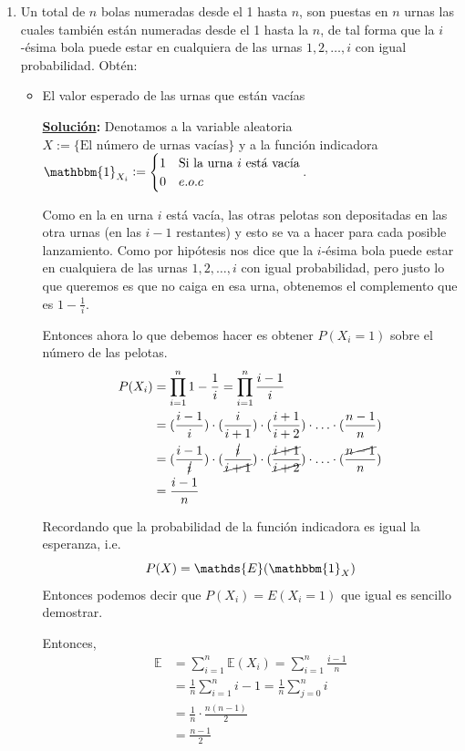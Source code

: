 \documentclass[11pt,letterpaper]{report}
\newcommand{\sol}{\textbf{\underline{Solución}: }} %
\begin{document}
\begin{enumerate}
\item Un total de $n$ bolas numeradas desde el 1 hasta $n$, son puestas en $n$ urnas las cuales
también están numeradas desde el 1 hasta la $n$, de tal forma que la $i$-ésima bola puede estar en
cualquiera de las urnas $1,2,\ldots,i$ con igual probabilidad. Obtén:
\begin{itemize}
    \item El valor esperado de las urnas que están vacías
    
    \sol Denotamos a la variable aleatoria $X := \{\text{El número de urnas vacías}\}$ y a la
    función indicadora
    $\mathbbm{1}_{X_i} := \begin{cases}
        1 & \text{Si la urna $i$ está vacía}\\
        0 & e.o.c
    \end{cases}$.

    Como en la en urna $i$ está vacía, las otras pelotas son depositadas en las otra urnas (en las
    $i-1$ restantes) y esto se va a hacer para cada posible lanzamiento. Como por hipótesis nos
    dice que la $i$-ésima bola puede estar en cualquiera de las urnas $1,2,\ldots,i$ con igual
    probabilidad, pero justo lo que queremos es que no caiga en esa urna, obtenemos el complemento
    que es $1 - \frac{1}{i}$.

    Entonces ahora lo que debemos hacer es obtener $P(X_i = 1)$ sobre el número de las pelotas.
    \begin{align*}
        P(X_i)
            &= \prod_{i=1}^{n} 1 - \frac{1}{i} = \prod_{i=1}^{n} \frac{i-1}{i}\\
            &= (\frac{i-1}{i}) \cdot (\frac{i}{i+1}) \cdot (\frac{i+1}{i+2}) \cdot \ldots \cdot (\frac{n-1}{n})\\
            &= (\frac{i-1}{\cancel{i}}) \cdot (\frac{\cancel{i}}{\cancel{i+1}}) \cdot 
                (\frac{\cancel{i+1}}{\cancel{i+2}}) \cdot \ldots \cdot (\frac{\cancel{n-1}}{n})\\
            &= \frac{i-1}{n}
    \end{align*}

    Recordando que la probabilidad de la función indicadora es igual la esperanza, i.e.
    $$P(X)= \mathds{E}(\mathbbm{1}_X)$$
    Entonces podemos decir que $P(X_i) = E(X_i = 1)$ que igual es sencillo demostrar.

    Entonces,
    \begin{align*}
        \mathds{E}
            &= \sum_{i=1}^{n} \mathds{E}(X_i) = \sum_{i=1}^{n} \frac{i-1}{n}\\
            &= \frac{1}{n} \sum_{i=1}^{n} i-1 = \frac{1}{n} \sum_{j=0}^{n} i\\
            &= \frac{1}{n} \cdot \frac{n(n-1)}{2}\\
            &= \frac{n-1}{2}
    \end{align*}


\end{itemize}
\end{enumerate}
\end{document}
